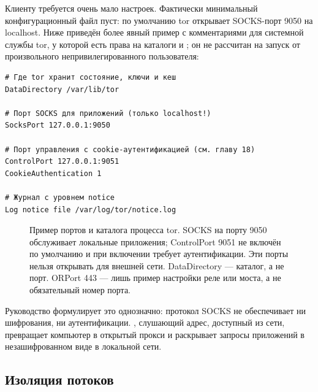 Клиенту требуется очень мало настроек. Фактически минимальный конфигурационный файл пуст: по умолчанию tor открывает SOCKS-порт 9050 на localhost. Ниже приведён более явный пример с комментариями для системной службы tor, у которой есть права на каталоги  и ; он не рассчитан на запуск от произвольного непривилегированного пользователя:
\begin{lstlisting}[language=torrc]
# Где tor хранит состояние, ключи и кеш
DataDirectory /var/lib/tor

# Порт SOCKS для приложений (только localhost!)
SocksPort 127.0.0.1:9050

# Порт управления с cookie-аутентификацией (см. главу 18)
ControlPort 127.0.0.1:9051
CookieAuthentication 1

# Журнал с уровнем notice
Log notice file /var/log/tor/notice.log
\end{lstlisting}

\begin{figure}[htbp]
\centering

\caption{Пример портов и каталога процесса tor. SOCKS на порту 9050 обслуживает локальные приложения; ControlPort 9051 не включён по умолчанию и при включении требует аутентификации. Эти порты нельзя открывать для внешней сети. DataDirectory — каталог, а не порт. ORPort 443 — лишь пример настройки реле или моста, а не обязательный номер порта.}
\label{fig:porte}
\end{figure}

\begin{attenzione}
Руководство формулирует это однозначно: протокол SOCKS не обеспечивает ни шифрования, ни аутентификации. , слушающий адрес, доступный из сети, превращает компьютер в открытый прокси и раскрывает запросы приложений в незашифрованном виде в локальной сети.
\end{attenzione}

\subsection{Изоляция потоков}\label{sec:torrc-isolamento}

